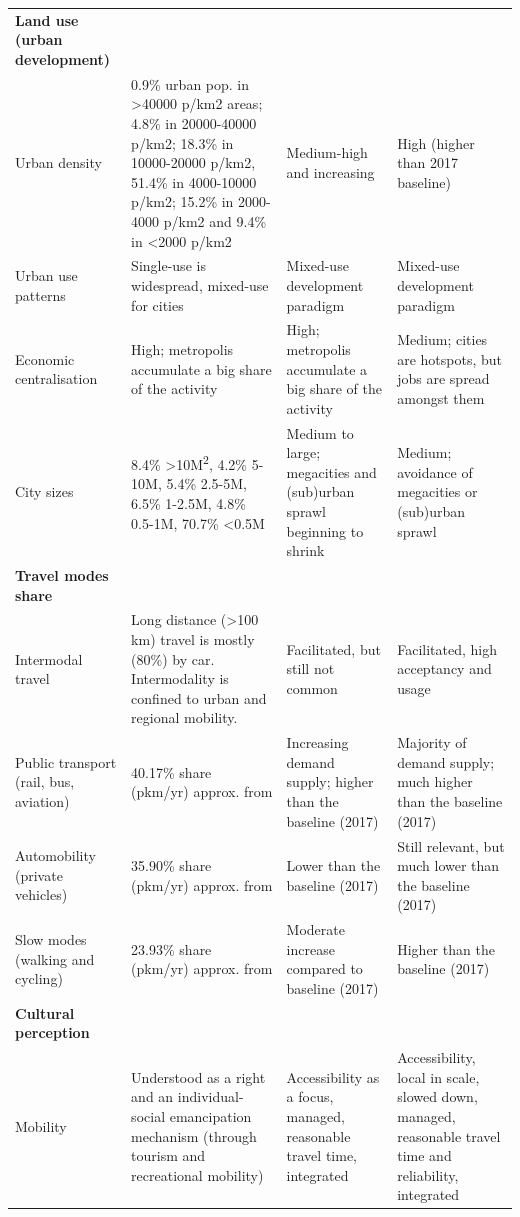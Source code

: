 \begin{longtable}{p{2.5cm}p{4.5cm}p{4cm}p{4cm}}
\textbf{Land use (urban development)} &  &  &  \\*
Urban density & 0.9\% urban pop. in \textgreater40000 p/km2 areas; 4.8\% in 20000-40000 p/km2; 18.3\% in 10000-20000 p/km2, 51.4\% in 4000-10000 p/km2; 15.2\% in 2000-4000 p/km2 and 9.4\% in \textless2000 p/km2 \parencite{cox2017_DemographiaWorldUrban} & Medium-high and increasing & High (higher than 2017 baseline) \\*
Urban use patterns & Single-use is widespread, mixed-use for cities & Mixed-use development paradigm & Mixed-use development paradigm \\*
Economic centralisation & High; metropolis accumulate a big share of the activity & High; metropolis accumulate a big share of the activity & Medium; cities are hotspots, but jobs are spread amongst them \\*
City sizes & 8.4\% \textgreater10M\textsuperscript{2}, 4.2\% 5-10M, 5.4\% 2.5-5M, 6.5\% 1-2.5M, 4.8\% 0.5-1M, 70.7\% \textless0.5M \parencite{cox2017_DemographiaWorldUrban} & Medium to large; megacities and (sub)urban sprawl beginning to shrink & Medium; avoidance of megacities or (sub)urban sprawl \\\addlinespace
\textbf{Travel modes share} &  &  &  \\*
Intermodal travel & Long distance (\textgreater100 km) travel is mostly (80\%) by car. Intermodality is confined to urban and regional mobility. \parencite{riley2010_IntermodalPassengerTransport} & Facilitated, but still not common & Facilitated, high acceptancy and usage \\*
Public transport (rail, bus, aviation) & 40.17\% share (pkm/yr) approx. from \parencite{vuuren2017_Energylanduse} & Increasing demand supply; higher than the baseline (2017) & Majority of demand supply; much higher than the baseline (2017) \\*
Automobility (private vehicles) & 35.90\% share (pkm/yr) approx. from \parencite{vuuren2017_Energylanduse} & Lower than the baseline (2017) & Still relevant, but much lower than the baseline (2017) \\*
Slow modes (walking and cycling) & 23.93\% share (pkm/yr) approx. from \parencite{vuuren2017_Energylanduse} & Moderate increase compared to baseline (2017) & Higher than the baseline (2017) \\\addlinespace
\textbf{Cultural perception} &  &  &  \\*
Mobility & Understood as a right and an individual-social emancipation mechanism (through tourism and recreational mobility) \parencite{sheller2008_MobilityFreedomPublic} & Accessibility as a focus, managed, reasonable travel time, integrated & Accessibility, local in scale, slowed down, managed, reasonable travel time and reliability, integrated \\*

\end{longtable}
